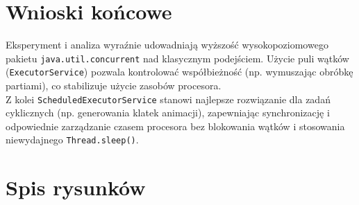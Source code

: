 \documentclass[11pt,a4paper]{article}
\begin{document}
\newpage\section{Wnioski końcowe}
Eksperyment i analiza wyraźnie udowadniają wyższość wysokopoziomowego pakietu \texttt{java.util.concurrent} nad klasycznym podejściem. Użycie puli wątków (\texttt{ExecutorService}) pozwala kontrolować współbieżność (np. wymuszając obróbkę partiami), co stabilizuje użycie zasobów procesora. \\Z kolei \texttt{ScheduledExecutorService} stanowi najlepsze rozwiązanie dla zadań cyklicznych (np. generowania klatek animacji), zapewniając synchronizację i odpowiednie zarządzanie czasem procesora bez blokowania wątków i stosowania niewydajnego \texttt{Thread.sleep()}.


    \newpage\section*{Spis rysunków}
    
	
	\listoffigures \label{sec:Figures}%
\end{document}
